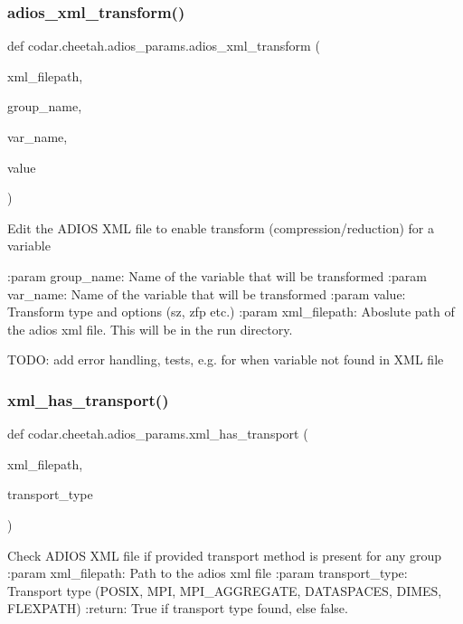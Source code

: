 \subsubsection{\texorpdfstring{adios\+\_\+xml\+\_\+transform()}{adios\_xml\_transform()}}
{\footnotesize\ttfamily def codar.\+cheetah.\+adios\+\_\+params.\+adios\+\_\+xml\+\_\+transform (\begin{DoxyParamCaption}\item[{}]{xml\+\_\+filepath,  }\item[{}]{group\+\_\+name,  }\item[{}]{var\+\_\+name,  }\item[{}]{value }\end{DoxyParamCaption})}

\begin{DoxyVerb}Edit the ADIOS XML file to enable transform (compression/reduction) for a
variable

:param group_name:   Name of the variable that will be transformed
:param var_name:     Name of the variable that will be transformed
:param value:        Transform type and options (sz, zfp etc.)
:param xml_filepath: Aboslute path of the adios xml file. This will be in
                     the run directory.

TODO: add error handling, tests, e.g. for when variable not found in XML
file
\end{DoxyVerb}
 \mbox{\label{namespacecodar_1_1cheetah_1_1adios__params_a9dff010d44b62d23336c76d11ed2c7e3}} 
\subsubsection{\texorpdfstring{xml\+\_\+has\+\_\+transport()}{xml\_has\_transport()}}
{\footnotesize\ttfamily def codar.\+cheetah.\+adios\+\_\+params.\+xml\+\_\+has\+\_\+transport (\begin{DoxyParamCaption}\item[{}]{xml\+\_\+filepath,  }\item[{}]{transport\+\_\+type }\end{DoxyParamCaption})}

\begin{DoxyVerb}Check ADIOS XML file if provided transport method is present for any group
:param xml_filepath: Path to the adios xml file
:param transport_type: Transport type (POSIX, MPI, MPI_AGGREGATE,
DATASPACES, DIMES, FLEXPATH)
:return: True if transport type found, else false.
\end{DoxyVerb}
 